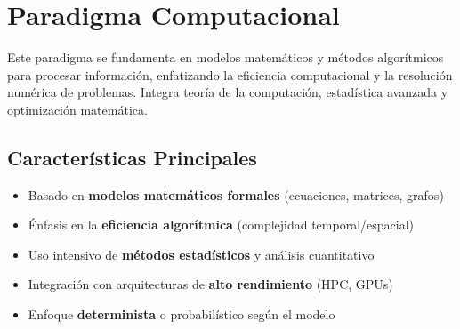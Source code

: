 \documentclass[14pt]{extarticle}
\begin{document}
  \section*{Paradigma Computacional}

  Este paradigma se fundamenta en modelos matemáticos y métodos algorítmicos para procesar información, enfatizando la eficiencia computacional y la resolución numérica de problemas. Integra teoría de la computación, estadística avanzada y optimización matemática.

  \subsection*{Características Principales}
  \begin{itemize}
    \item Basado en \textbf{modelos matemáticos formales} (ecuaciones, matrices, grafos)
    \item Énfasis en la \textbf{eficiencia algorítmica} (complejidad temporal/espacial)
    \item Uso intensivo de \textbf{métodos estadísticos} y análisis cuantitativo
    \item Integración con arquitecturas de \textbf{alto rendimiento} (HPC, GPUs)
    \item Enfoque \textbf{determinista} o probabilístico según el modelo
  \end{itemize}
\end{document}
